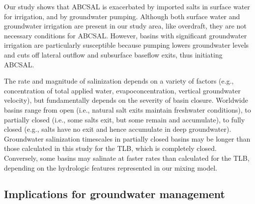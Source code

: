 Our study shows that ABCSAL is exacerbated by imported salts in surface water for irrigation, and by groundwater pumping. Although both surface water and groundwater irrigation are present in our study area, like overdraft, they are not necessary conditions for ABCSAL. However, basins with significant groundwater irrigation are particularly susceptible because pumping lowers groundwater levels and cuts off lateral outflow and subsurface baseflow exits, thus initiating ABCSAL.

The rate and magnitude of salinization depends on a variety of factors (e.g., concentration of total applied water, evapoconcentration, vertical groundwater velocity), but fundamentally depends on the severity of basin closure. Worldwide basins range from open (i.e., natural salt exits maintain freshwater conditions), to partially closed (i.e., some salts exit, but some remain and accumulate), to fully closed (e.g., salts have no exit and hence accumulate in deep groundwater). Groundwater salinization timescales in partially closed basins may be longer than those calculated in this study for the TLB, which is completely closed. Conversely, some basins may salinate at faster rates than calculated for the TLB, depending on the hydrologic features represented in our mixing model.  



%
%
\subsection{Implications for groundwater management}
\label{ss_4_3}



